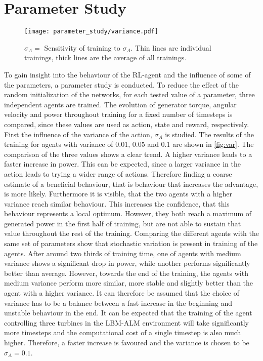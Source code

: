 \section{Parameter Study}
\begin{figure}[ht]
	\centering
	\texttt{[image: parameter\_study/variance.pdf]}
	\caption{$\sigma_A=$ Sensitivity of training to $\sigma_A$. Thin lines are individual trainings, thick lines are the average of all trainings.}
	\label{fig:var}
\end{figure}
To gain insight into the behaviour of the RL-agent and the influence of some of the parameters, a parameter study is conducted. To reduce the effect of the random initialization of the networks, for each tested value of a parameter, three independent agents are trained. The evolution of generator torque, angular velocity and power throughout training for a fixed number of timesteps is compared, since these values are used as action, state and reward, respectively. \\
First the influence of the variance of the action, $\sigma_A$ is studied. The results of the training for agents with variance of $0.01$, $0.05$ and $0.1$ are shown in \autoref{fig:var}. The comparison of the three values shows a clear trend. A higher variance leads to a faster increase in power. 
This can be expected, since a larger variance in the action leads to trying a wider range of actions. Therefore finding a coarse estimate of a beneficial behaviour, that is behaviour that increases the advantage, is more likely. Furthermore it is visible, that the two agents with a higher variance reach similar behaviour. This increases the confidence, that this behaviour represents a local optimum. However, they both reach a maximum of generated power in the first half of training, but are not able to sustain that value throughout the rest of the training. Comparing the different agents with the same set of parameters show that stochastic variation is present in training of the agents.  After around two thirds of training time, one of agents with medium variance shows a significant drop in power, while another performs significantly better than average. However, towards the end of the training, the agents with medium variance perform more similar, more stable and slightly better than the agent with a higher variance. It can therefore be assumed that the choice of variance has to be a balance between a fast increase in the beginning and unstable behaviour in the end. It can be expected that the training of the agent controlling three turbines in the LBM-ALM environment will take significantly more timesteps and the computational cost of a single timestep is also much higher. Therefore, a faster increase is favoured and the variance is chosen to be $\sigma_A = 0.1$. \\
